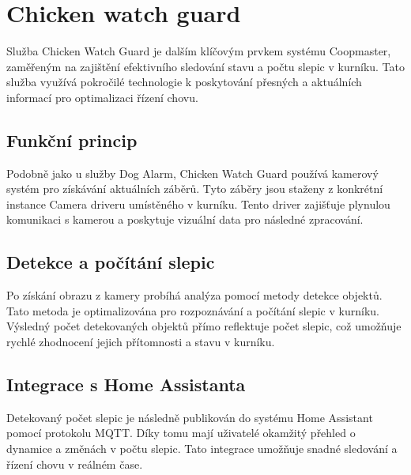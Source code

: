 \section{Chicken watch guard}\label{sec:chicken-watch-guard}

Služba Chicken Watch Guard je dalším klíčovým prvkem systému Coopmaster, zaměřeným na zajištění efektivního sledování stavu a počtu slepic v kurníku.
Tato služba využívá pokročilé technologie k poskytování přesných a aktuálních informací pro optimalizaci řízení chovu.

\subsection*{Funkční princip}

Podobně jako u služby Dog Alarm, Chicken Watch Guard používá kamerový systém pro získávání aktuálních záběrů.
Tyto záběry jsou staženy z konkrétní instance Camera driveru umístěného v kurníku.
Tento driver zajišťuje plynulou komunikaci s kamerou a poskytuje vizuální data pro následné zpracování.

\subsection*{Detekce a počítání slepic}

Po získání obrazu z kamery probíhá analýza pomocí metody detekce objektů.
Tato metoda je optimalizována pro rozpoznávání a počítání slepic v kurníku.
Výsledný počet detekovaných objektů přímo reflektuje počet slepic, což umožňuje rychlé zhodnocení jejich přítomnosti a stavu v kurníku.

\subsection*{Integrace s Home Assistanta}

Detekovaný počet slepic je následně publikován do systému Home Assistant pomocí protokolu MQTT. Díky tomu mají uživatelé okamžitý přehled o dynamice a změnách v počtu slepic.
Tato integrace umožňuje snadné sledování a řízení chovu v reálném čase.

